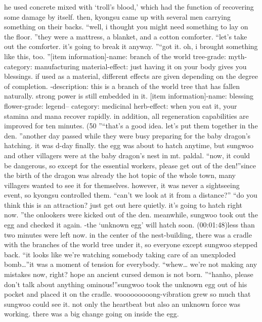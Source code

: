 he used concrete mixed with ‘troll’s blood,’ which had the function of recovering some damage by itself.
then, kyongsu came up with several men carrying something on their backs.
“well, i thought you might need something to lay on the floor.
”they were a mattress, a blanket, and a cotton comforter.
“let’s take out the comforter.
 it’s going to break it anyway.
”“got it.
 oh, i brought something like this, too.
”[item information]-name: branch of the world tree-grade: myth-category: manufacturing material-effect: just having it on your body gives you blessings.
 if used as a material, different effects are given depending on the degree of completion.
-description: this is a branch of the world tree that has fallen naturally.
 strong power is still embedded in it.
[item information]-name: blessing flower-grade: legend– category: medicinal herb-effect: when you eat it, your stamina and mana recover rapidly.
 in addition, all regeneration capabilities are improved for ten minutes.
 (50%
”“that’s a good idea.
 let’s put them together in the den.
”another day passed while they were busy preparing for the baby dragon’s hatching.
it was d-day finally.
 the egg was about to hatch anytime, but sungwoo and other villagers were at the baby dragon’s nest in mt.
 paldal.
“now, it could be dangerous, so except for the essential workers, please get out of the den!”since the birth of the dragon was already the hot topic of the whole town, many villagers wanted to see it for themselves.
 however, it was never a sightseeing event, so kyongsu controlled them.
“can’t we look at it from a distance?”
“do you think this is an attraction? just get out here quietly.
 it’s going to hatch right now.
”the onlookers were kicked out of the den.
meanwhile, sungwoo took out the egg and checked it again.
-the ‘unknown egg’ will hatch soon.
 (00:01:48)less than two minutes were left now.
 in the center of the nest-building, there was a cradle with the branches of the world tree under it, so everyone except sungwoo stepped back.
“it looks like we’re watching somebody taking care of an unexploded bomb…”it was a moment of tension for everybody.
“whew… we’re not making any mistakes now, right? hope an ancient cursed demon is not born.
”“hanho, please don’t talk about anything ominous!”sungwoo took the unknown egg out of his pocket and placed it on the cradle.
wooooooooong-vibration grew so much that sungwoo could see it.
not only the heartbeat but also an unknown force was working.
 there was a big change going on inside the egg.
